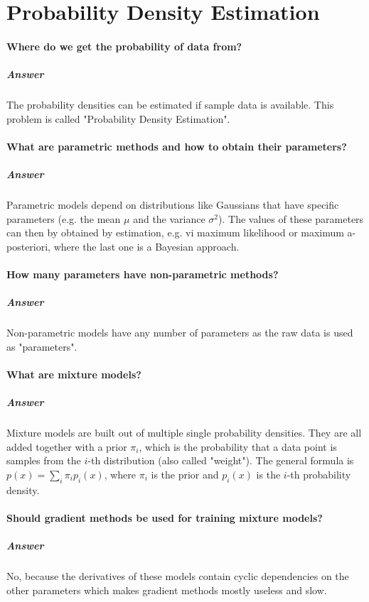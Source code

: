 \documentclass[a4paper, 11pt, accentcolor = tud3b]{tudreport}
\newcommand{\answer}[1]{\subparagraph{Answer} #1}
\begin{document}
		\section{Probability Density Estimation}
			\paragraph{Where do we get the probability of data from?}
			\answer{The probability densities can be estimated if sample data is available. This problem is called "Probability Density Estimation".}

			\paragraph{What are parametric methods and how to obtain their parameters?}
			\answer{Parametric models depend on distributions like Gaussians that have specific parameters (e.g. the mean \(\mu\) and the variance \(\sigma^2\)). The values of these parameters can then by obtained by estimation, e.g. vi maximum likelihood or maximum a-posteriori, where the last one is a Bayesian approach.}

			\paragraph{How many parameters have non-parametric methods?}
			\answer{Non-parametric models have any number of parameters as the raw data is used as "parameters".}

			\paragraph{What are mixture models?}
			\answer{Mixture models are built out of multiple single probability densities. They are all added together with a prior \(\pi_i\), which is the probability that a data point is samples from the \(i\)-th distribution (also called "weight"). The general formula is \( p(x) = \sum_i \pi_i p_i(x) \), where \(\pi_i\) is the prior and \(p_i(x)\) is the \(i\)-th probability density.}

			\paragraph{Should gradient methods be used for training mixture models?}
			\answer{No, because the derivatives of these models contain cyclic dependencies on the other parameters which makes gradient methods mostly useless and slow.}
\end{document}
